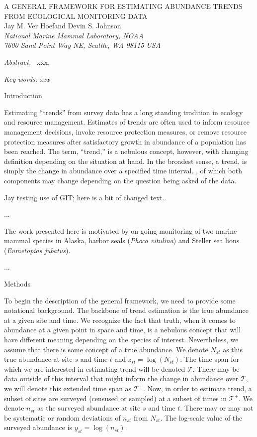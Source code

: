 \documentclass[12pt,letter]{article}
\newcommand{\Nst}{\ensuremath{N_{st}}}
\newcommand{\nst}{\ensuremath{n_{st}}}
\newcommand{\zst}{\ensuremath{z_{st}}}
\newcommand{\yst}{\ensuremath{y_{st}}}
\newcommand{\fT}{\ensuremath{\mathcal{T}}}
\newcommand{\fTp}{\ensuremath{\mathcal{T}^+}}
\begin{document}
\begin{center}
\Large A GENERAL FRAMEWORK FOR ESTIMATING ABUNDANCE TRENDS FROM ECOLOGICAL MONITORING DATA
\bigskip\\
\normalsize
{\sc Jay M. Ver Hoef\footnotemark[1] and Devin S. Johnson}\smallskip\\
{\em National Marine Mammal Laboratory, NOAA\\
7600 Sand Point Way NE, Seattle,
WA 98115 USA }\\ \medskip
\end{center}

\raggedright \setlength{\parindent}{0.3in}
\renewcommand{\baselinestretch}{1.7}\normalsize
{}
 \linenumbers

{\em Abstract.\ } xxx.

{\em Key words: xxx}

\centerline{\sc Introduction}

Estimating ``trends'' from survey data has a long standing tradition in ecology and resource management. Estimates of trends are often used to inform resource management decisions, invoke resource protection measures, or remove resource protection measures after satisfactory growth in abundance of a population has been reached. The term, ``trend,'' is a nebulous concept, however, with changing definition depending on the situation at hand. In the broadest sense, a trend, is simply the change in abundance over a specified time interval. , of which both components may change depending on the question being asked of the data.   

Jay testing use of GIT; here is a bit of changed text..

...

The work presented here is motivated by on-going monitoring of two marine mammal species in Alaska, harbor seals ({\it Phoca vitulina}) and Steller sea lions ({\it Eumetopias jubatus}).

...
   
\centerline{\sc Methods}

To begin the description of the general framework, we need to provide some notational background. The backbone of trend estimation is the true abundance at a given site and time. We recognize the fact that truth, when it comes to abundance at a given point in space and time, is a nebulous concept that will have different meaning depending on the species of interest. Nevertheless, we assume that there is some concept of a true abundance. We denote $\Nst$ as this true abundance at site $s$ and time $t$ and $\zst=\log(\Nst)$. The time span for which we are interested in estimating trend will be denoted $\fT$. There may be data outside of this interval that might inform the change in abundance over $\fT$, we will denote this extended time span as $\fTp$. Now, in order to estimate trend, a subset of sites are surveyed (censused or sampled) at a subset of times in $\fTp$. We denote $\nst$ as the surveyed abundance at site $s$ and time $t$. There may or may not be systematic or random deviations of $\nst$ from $\Nst$. The log-scale value of the surveyed abundance is $\yst=\log(\nst)$.  
\end{document}
